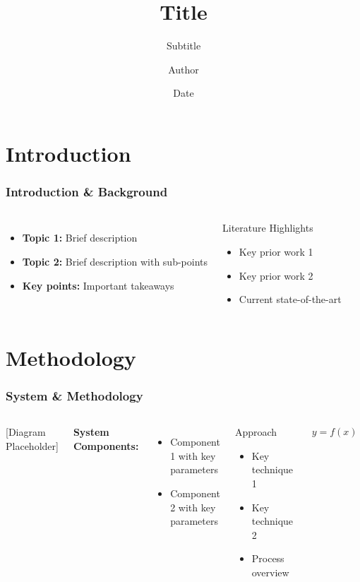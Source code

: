 \documentclass[
    9pt,
    aspectratio=169,
]{beamer}
\title[Title]{Title}
\subtitle[Subtitle]{Subtitle}
\author[Author]{Author}
\institute[]{Institute}
\date[Date]{Date}
\begin{document}
\begin{frame}
\titlepage
\end{frame}

\section{Introduction}

\begin{frame}
\frametitle{Introduction \& Background}
\begin{columns}
\begin{itemize}
    \item \textbf{Topic 1:} Brief description
    \item \textbf{Topic 2:} Brief description with sub-points
    \item \textbf{Key points:} Important takeaways 
\end{itemize}

\begin{block}{Literature Highlights}
    \begin{itemize}
        \item Key prior work 1
        \item Key prior work 2
        \item Current state-of-the-art
    \end{itemize}
\end{block}
\end{columns}
\end{frame}

\section{Methodology}

\begin{frame}
\frametitle{System \& Methodology}
\begin{columns}
\begin{center}
[Diagram Placeholder]
\end{center}

\textbf{System Components:}
\begin{itemize}
    \item Component 1 with key parameters
    \item Component 2 with key parameters
\end{itemize}

\begin{block}{Approach}
    \begin{itemize}
        \item Key technique 1
        \item Key technique 2
        \item Process overview
    \end{itemize}
\end{block}

\begin{align}
    y = f(x)  %
\end{align}
\end{columns}
\end{frame}
\end{document}

